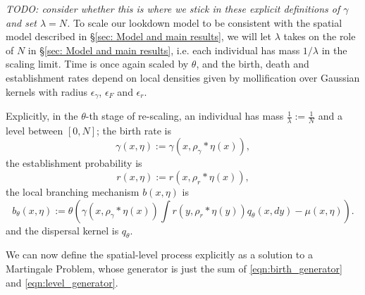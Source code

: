 \documentclass[12pt]{article}
\newcommand{\kernel}{\rho}  %
\newcommand{\smooth}[1]{\kernel_{#1} \! * \!}  %
\newcommand{\comment}[1]{{\color{blue} \it #1}}
\begin{document}
\comment{TODO: consider whether this is where we stick in
    these explicit definitions of $\gamma$ and set $\lambda=N$.}
To scale our lookdown model to be consistent with
the spatial model described in \S \ref{sec: Model and main results},
we will let $\lambda$ takes on the role of $N$
in \S \ref{sec: Model and main results},
i.e. each individual has mass $1/\lambda$
in the scaling limit.
Time is once again scaled by $\theta$,
and the birth, death and establishment rates 
depend on local densities given by
mollification over Gaussian kernels with radius
$\epsilon_{\gamma}$, $\epsilon_{F}$ and $\epsilon_{r}$.

Explicitly, in the $\theta$-th stage of re-scaling,
an individual has mass $\frac{1}{\lambda} := \frac{1}{N}$
and a level between $[0,N]$;
the birth rate is
$$
    \gamma(x, \eta)
    :=
    \gamma(x, \smooth{\gamma}\eta(x)),
$$
the establishment probability is
$$
    r(x, \eta)
    :=
    r(x, \smooth{r}\eta(x)),
$$
the local branching mechanism $b(x,\eta)$ is 
$$
    b_{\theta}(x, \eta)
    :=
    \theta \left(
        \gamma(x, \smooth{\gamma}\eta(x))
        \int r(y, \smooth{r}\eta(y)) q_{\theta}(x,dy)
        -
        \mu(x, \eta)
    \right) .
$$
and the dispersal kernel is $q_\theta$.

We can now define the spatial-level process
explicitly as a solution to a Martingale Problem,
whose generator is just the sum of
\eqref{eqn:birth_generator} and \eqref{eqn:level_generator}.
\end{document}
